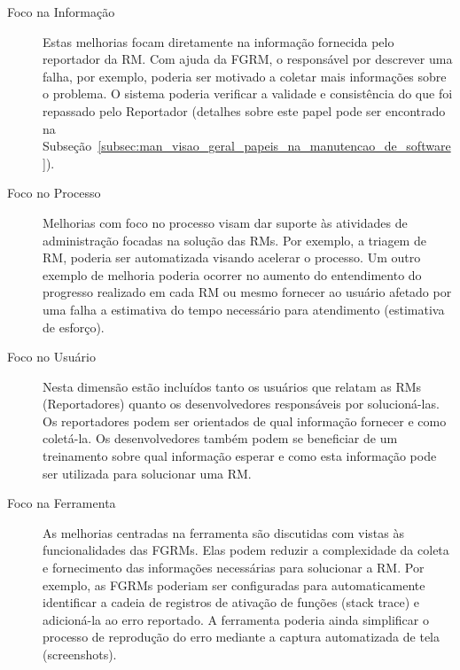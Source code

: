 \begin{description}
	\item[Foco na Informação] Estas melhorias focam diretamente na informação
		fornecida pelo reportador da RM\@. Com ajuda da FGRM, o responsável por
		descrever uma falha, por exemplo, poderia ser motivado a coletar mais
		informações sobre o problema. O sistema poderia verificar a validade e
		consistência do que foi repassado pelo Reportador (detalhes sobre este
		papel pode ser encontrado na
		Subseção~\ref{subsec:man_visao_geral_papeis_na_manutencao_de_software}).
	\item[Foco no Processo] Melhorias com foco no processo visam dar suporte às
		atividades de administração focadas na solução das RMs. Por exemplo, a
		triagem de RM, poderia ser automatizada visando acelerar o processo. Um
		outro exemplo de melhoria poderia ocorrer no aumento do entendimento do
		progresso realizado em cada RM ou mesmo fornecer ao usuário afetado por
		uma falha a estimativa do tempo necessário para atendimento (estimativa
		de esforço).
	\item[Foco no Usuário] Nesta dimensão estão incluídos tanto os usuários que
		relatam as RMs (Reportadores) quanto os desenvolvedores responsáveis por
		solucioná-las. Os reportadores podem ser orientados de qual informação
		fornecer e como coletá-la. Os desenvolvedores também podem se beneficiar
		de um treinamento sobre qual informação esperar e como esta
		informação pode ser utilizada para solucionar uma RM\@.
	\item[Foco na Ferramenta] As melhorias centradas na ferramenta são
		discutidas com vistas às funcionalidades das FGRMs\@. Elas podem reduzir
		a complexidade da coleta e fornecimento das informações necessárias para
		solucionar a RM\@. Por exemplo, as FGRMs poderiam ser configuradas para
		automaticamente identificar a cadeia de registros de ativação de funções
		(stack trace) e adicioná-la ao erro reportado. A ferramenta poderia
		ainda simplificar o processo de reprodução do erro mediante a captura
		automatizada de tela (screenshots).
\end{description}



